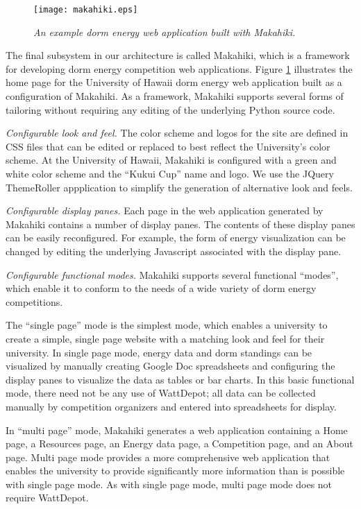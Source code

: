 \begin{figure}[!th]
  \center
  \texttt{[image: makahiki.eps]}
  \caption{\em \small An example dorm energy web application built with Makahiki.}
  \label{fig:makahiki}
\end{figure} 

The final subsystem in our architecture is called Makahiki, which is a
framework for developing dorm energy competition web applications.  Figure
\ref{fig:makahiki} illustrates the home page for the University of Hawaii
dorm energy web application built as a configuration of Makahiki. As a
framework, Makahiki supports several forms of tailoring without requiring
any editing of the underlying Python source code.

{\em Configurable look and feel.} The color scheme and logos for the site
are defined in CSS files that can be edited or replaced to best reflect the
University's color scheme. At the University of Hawaii, Makahiki is
configured with a green and white color scheme and the ``Kukui Cup'' name
and logo.   We use the JQuery ThemeRoller appplication to simplify the generation of 
alternative look and feels.

{\em Configurable display panes.} Each page in the web application generated by Makahiki
contains a number of display panes. The contents of these display panes can be easily 
reconfigured. For example, the form of energy visualization can be changed by editing 
the underlying Javascript associated with the display pane. 

{\em Configurable functional modes.}  Makahiki supports several functional ``modes'', which 
enable it to conform to the needs of a wide variety of dorm energy competitions.  

The ``single page'' mode is the simplest mode, which enables a university
to create a simple, single page website with a matching look and feel for
their university.  In single page mode, energy data and dorm standings can
be visualized by manually creating Google Doc spreadsheets and configuring
the display panes to visualize the data as tables or bar charts.  In this
basic functional mode, there need not be any use of WattDepot; all data can
be collected manually by competition organizers and entered into
spreadsheets for display.

In ``multi page'' mode, Makahiki generates a web application containing a
Home page, a Resources page, an Energy data page, a Competition page, and
an About page.  Multi page mode provides a more comprehensive web
application that enables the university to provide significantly more
information than is possible with single page mode.  As with single page
mode, multi page mode does not require WattDepot.


